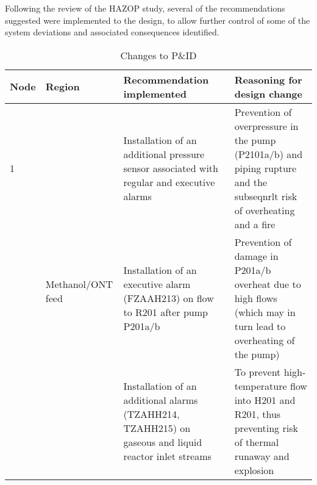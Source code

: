 Following the review of the HAZOP study, several of the recommendations suggested were implemented to the design, to allow further control of some of the system deviations and associated  consequences identified. 

\begin{table}[h]
\centering
\caption{Changes to P\&ID}
\label{tab:PIDchanges}
\footnotesize
\begin{tabularx}{\linewidth}{@{}lp{3cm}XX@{}}
\toprule
Node & Region                        & Recommendation implemented                                                                                                                                    & Reasoning for design change                                                                                                                                                                                                                                                  \\ \midrule
1    & \multirow[t]{3}{*}{Methanol/ONT feed}         & Installation of an additional pressure sensor associated with regular and executive alarms                                                                    & Prevention of overpressure in the pump (P2101a/b) and piping rupture and the subseqnrlt risk of overheating and a fire                                                                                     \\ \cmidrule(l){3-4} 
     &                                            & Installation of an executive alarm (FZAAH213) on flow to R201 after pump P201a/b                                                                              & Prevention of damage in P201a/b overheat due to high flows (which may in turn lead to overheating of the pump)                                                                                           \\ \cmidrule(l){3-4} 
     &                                            & Installation of an additional alarms (TZAHH214, TZAHH215) on gaseous and liquid reactor inlet streams                                                         & To prevent high-temperature flow into H201 and R201, thus preventing risk of thermal runaway and explosion                                                                                               \\ \cmidrule(l){2-4} 

\end{tabularx}
\end{table}
